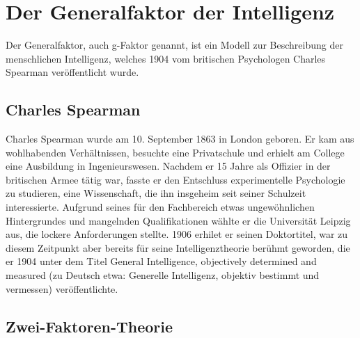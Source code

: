 \chapter{Der Generalfaktor der Intelligenz}

Der Generalfaktor, auch g-Faktor genannt, ist ein Modell zur Beschreibung der
menschlichen Intelligenz, welches 1904 vom britischen Psychologen
Charles Spearman veröffentlicht wurde. \cite{wiki_spearman}

\section{Charles Spearman}
Charles Spearman wurde am 10. September 1863 in London geboren. \cite{wiki_spearman} Er kam aus wohlhabenden Verhältnissen, besuchte eine Privatschule und erhielt am College eine Ausbildung in Ingenieurswesen. Nachdem er 15 Jahre als Offizier in der britischen Armee tätig war, fasste er den Entschluss experimentelle Psychologie zu studieren, eine Wissenschaft, die ihn insgeheim seit seiner Schulzeit interessierte. \cite{galton_spearman} Aufgrund seines für den Fachbereich etwas ungewöhnlichen Hintergrundes und mangelnden Qualifikationen wählte er die Universität Leipzig aus, die lockere Anforderungen stellte. 1906 erhilet er seinen Doktortitel, war zu diesem Zeitpunkt aber bereits für seine Intelligenztheorie berühmt geworden, die er 1904 unter dem Titel \glqq General Intelligence, objectively determined and measured\grqq{} (zu Deutsch etwa: Generelle Intelligenz, objektiv bestimmt und vermessen) veröffentlichte.
\cite{wiki_en_spearman} \cite{york_spearman}

\section{Zwei-Faktoren-Theorie}


\cite{wiki_intheorie}
